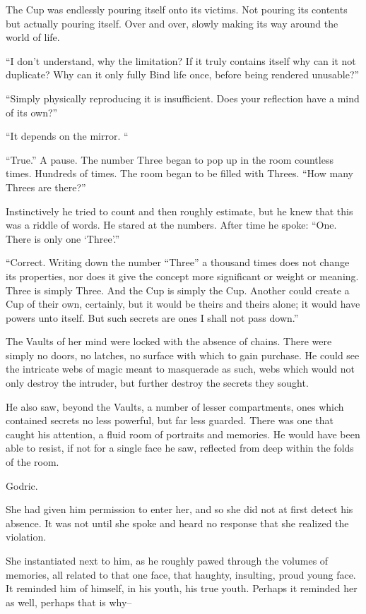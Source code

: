 The Cup was endlessly pouring itself onto its victims. Not pouring its contents but actually pouring itself. Over and over, slowly making its way around the world of life.

“I don’t understand, why the limitation? If it truly contains itself why can it not duplicate? Why can it only fully Bind life once, before being rendered unusable?”

“Simply physically reproducing it is insufficient. Does your reflection have a mind of its own?”

“It depends on the mirror. “

“True.” A pause. The number Three began to pop up in the room countless times. Hundreds of times. The room began to be filled with Threes. “How many Threes are there?”

Instinctively he tried to count and then roughly estimate, but he knew that this was a riddle of words. He stared at the numbers. After time he spoke: “One. There is only one ‘Three’.”

“Correct. Writing down the number “Three” a thousand times does not change its properties, nor does it give the concept more significant or weight or meaning. Three is simply Three. And the Cup is simply the Cup. Another could create a Cup of their own, certainly, but it would be theirs and theirs alone; it would have powers unto itself. But such secrets are ones I shall not pass down.”

The Vaults of her mind were locked with the absence of chains. There were simply no doors, no latches, no surface with which to gain purchase. He could see the intricate webs of magic meant to masquerade as such, webs which would not only destroy the intruder, but further destroy the secrets they sought.

He also saw, beyond the Vaults, a number of lesser compartments, ones which contained secrets no less powerful, but far less guarded. There was one that caught his attention, a fluid room of portraits and memories. He would have been able to resist, if not for a single face he saw, reflected from deep within the folds of the room.

Godric.

She had given him permission to enter her, and so she did not at first detect his absence. It was not until she spoke and heard no response that she realized the violation.

She instantiated next to him, as he roughly pawed through the volumes of memories, all related to that one face, that haughty, insulting, proud young face. It reminded him of himself, in his youth, his true youth. Perhaps it reminded her as well, perhaps that is why–

